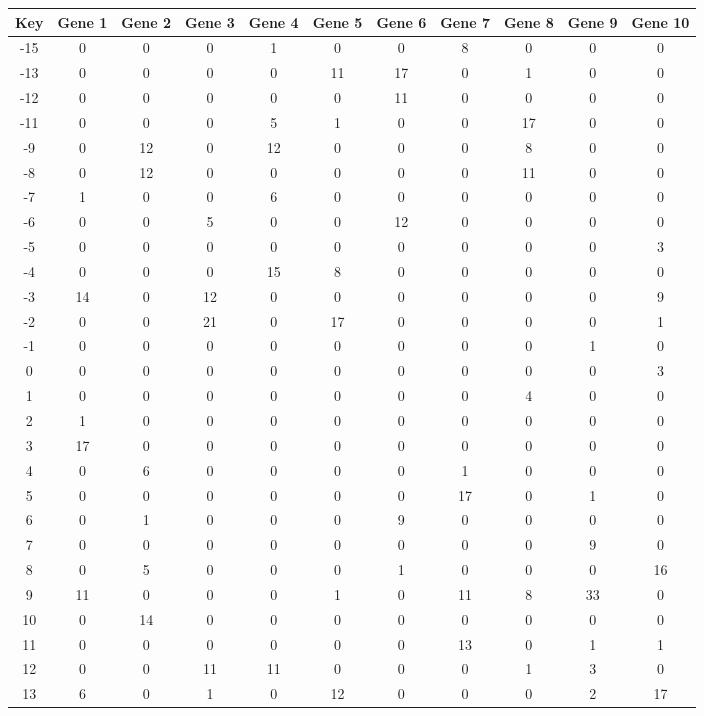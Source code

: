 \begin{tabular}{|c|c|c|c|c|c|c|c|c|c|c|}
\hline
Key & Gene 1 & Gene 2 & Gene 3 & Gene 4 & Gene 5 & Gene 6 & Gene 7 & Gene 8 & Gene 9 & Gene 10 \\
\hline
-15 & 0 & 0 & 0 & 1 & 0 & 0 & 8 & 0 & 0 & 0 \\
-13 & 0 & 0 & 0 & 0 & 11 & 17 & 0 & 1 & 0 & 0 \\
-12 & 0 & 0 & 0 & 0 & 0 & 11 & 0 & 0 & 0 & 0 \\
-11 & 0 & 0 & 0 & 5 & 1 & 0 & 0 & 17 & 0 & 0 \\
-9 & 0 & 12 & 0 & 12 & 0 & 0 & 0 & 8 & 0 & 0 \\
-8 & 0 & 12 & 0 & 0 & 0 & 0 & 0 & 11 & 0 & 0 \\
-7 & 1 & 0 & 0 & 6 & 0 & 0 & 0 & 0 & 0 & 0 \\
-6 & 0 & 0 & 5 & 0 & 0 & 12 & 0 & 0 & 0 & 0 \\
-5 & 0 & 0 & 0 & 0 & 0 & 0 & 0 & 0 & 0 & 3 \\
-4 & 0 & 0 & 0 & 15 & 8 & 0 & 0 & 0 & 0 & 0 \\
-3 & 14 & 0 & 12 & 0 & 0 & 0 & 0 & 0 & 0 & 9 \\
-2 & 0 & 0 & 21 & 0 & 17 & 0 & 0 & 0 & 0 & 1 \\
-1 & 0 & 0 & 0 & 0 & 0 & 0 & 0 & 0 & 1 & 0 \\
0 & 0 & 0 & 0 & 0 & 0 & 0 & 0 & 0 & 0 & 3 \\
1 & 0 & 0 & 0 & 0 & 0 & 0 & 0 & 4 & 0 & 0 \\
2 & 1 & 0 & 0 & 0 & 0 & 0 & 0 & 0 & 0 & 0 \\
3 & 17 & 0 & 0 & 0 & 0 & 0 & 0 & 0 & 0 & 0 \\
4 & 0 & 6 & 0 & 0 & 0 & 0 & 1 & 0 & 0 & 0 \\
5 & 0 & 0 & 0 & 0 & 0 & 0 & 17 & 0 & 1 & 0 \\
6 & 0 & 1 & 0 & 0 & 0 & 9 & 0 & 0 & 0 & 0 \\
7 & 0 & 0 & 0 & 0 & 0 & 0 & 0 & 0 & 9 & 0 \\
8 & 0 & 5 & 0 & 0 & 0 & 1 & 0 & 0 & 0 & 16 \\
9 & 11 & 0 & 0 & 0 & 1 & 0 & 11 & 8 & 33 & 0 \\
10 & 0 & 14 & 0 & 0 & 0 & 0 & 0 & 0 & 0 & 0 \\
11 & 0 & 0 & 0 & 0 & 0 & 0 & 13 & 0 & 1 & 1 \\
12 & 0 & 0 & 11 & 11 & 0 & 0 & 0 & 1 & 3 & 0 \\
13 & 6 & 0 & 1 & 0 & 12 & 0 & 0 & 0 & 2 & 17 \\
\hline
\end{tabular}